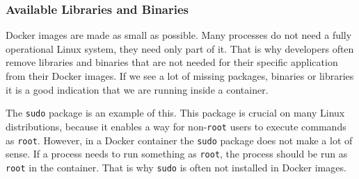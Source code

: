 \subsubsection{Available Libraries and Binaries}\label{subsubsection:binaries}
Docker images are made as small as possible. Many processes do not need a fully operational Linux system, they need only part of it. That is why developers often remove libraries and binaries that are not needed for their specific application from their Docker images. If we see a lot of missing packages, binaries or libraries it is a good indication that we are running inside a container.

\medskip

The \lstinline{sudo} package is an example of this. This package is crucial on many Linux distributions, because it enables a way for non-\lstinline{root} users to execute commands as \lstinline{root}. However, in a Docker container the \lstinline{sudo} package does not make a lot of sense. If a process needs to run something as \lstinline{root}, the process should be run as \lstinline{root} in the container. That is why \lstinline{sudo} is often not installed in Docker images.
